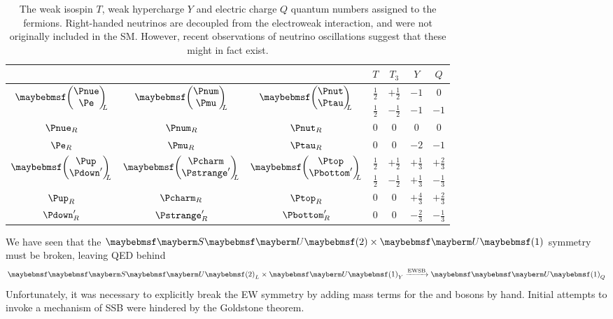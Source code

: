 \begin{table}
	\begin{tabular}{ccc@{\hskip 1cm}cccc}
		& & & $T$ & $T_3$ & $Y$ & $Q$ \\
		\hline
		\multirow{2}{*}{$\colvector{\Pnue\\ \Pe}_{\!\!\!L}$} & 
		\multirow{2}{*}{$\colvector{\Pnum\\ \Pmu}_{\!\!\!L}$} & 
		\multirow{2}{*}{$\colvector{\Pnut\\ \Ptau}_{\!\!\!L}$} & 
		$\tfrac{1}{2}$ & $+\tfrac{1}{2}$ & $-1$ & 0 \\
		& & & $\tfrac{1}{2}$ & $-\tfrac{1}{2}$ & $-1$ & $-1$ \\
		$\Pnue_R$ & $\Pnum_R$ & $\Pnut_R$ & 0 & 0 & 0 & 0 \\
		$\Pe_R$ & $\Pmu_R$ & $\Ptau_R$ & 0 & 0 & $-2$ & $-1$ \\
		\hline
		\multirow{2}{*}{$\colvector{\Pup\\ \Pdown'}_{\!\!\!L}$} & 
		\multirow{2}{*}{$\colvector{\Pcharm\\ \Pstrange'}_{\!\!\!L}$} & 
		\multirow{2}{*}{$\colvector{\Ptop\\ \Pbottom'}_{\!\!\!L}$} & 
		$\tfrac{1}{2}$ & $+\tfrac{1}{2}$ & $+\tfrac{1}{3}$ & $+\tfrac{2}{3}$ \\
		& & & $\tfrac{1}{2}$ & $-\tfrac{1}{2}$ & $+\tfrac{1}{3}$ & $-\tfrac{1}{3}$ \\
		$\Pup_R$ & $\Pcharm_R$ & $\Ptop_R$ & 0 & 0 & $+\tfrac{4}{3}$ & $+\tfrac{2}{3}$ \\
		$\Pdown'_R$ & $\Pstrange'_R$ & $\Pbottom'_R$ & 0 & 0 & $-\tfrac{2}{3}$ & $-\tfrac{1}{3}$ \\
	\end{tabular}
	\caption{The weak isospin $T$, weak hypercharge $Y$ and electric charge $Q$ quantum
	numbers assigned to the fermions. Right-handed neutrinos are decoupled from the 
	electroweak interaction, and were not originally included in the \ac{SM}. However, 
	recent observations of neutrino oscillations suggest that these might in fact exist.}
	\label{tab:ew_fermions}
\end{table}

We have seen that the $\SUgroup{2}\times\Ugroup{1}$ symmetry must be broken, leaving 
\ac{QED} behind
\begin{equation*}
\EWgroup \xrightarrow{\text{EWSB}} \QEDgroup
\end{equation*}
Unfortunately, it was necessary to explicitly break the \ac{EW} symmetry by adding mass
terms for the \PWpm and \PZ bosons by hand. Initial attempts to invoke a mechanism of 
\ac{SSB} were hindered by the Goldstone theorem.




